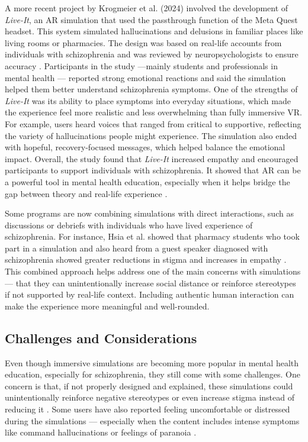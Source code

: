 A more recent project by Krogmeier et al. (2024) involved the development of \textit{Live-It}, an AR simulation that used the passthrough function of the Meta Quest headset. This system simulated hallucinations and delusions in familiar places like living rooms or pharmacies. The design was based on real-life accounts from individuals with schizophrenia and was reviewed by neuropsychologists to ensure accuracy \cite{Krogmeier2024}. Participants in the study  —mainly students and professionals in mental health — reported strong emotional reactions and said the simulation helped them better understand schizophrenia symptoms. One of the strengths of \textit{Live-It} was its ability to place symptoms into everyday situations, which made the experience feel more realistic and less overwhelming than fully immersive VR. For example, users heard voices that ranged from critical to supportive, reflecting the variety of hallucinations people might experience. The simulation also ended with hopeful, recovery-focused messages, which helped balance the emotional impact. Overall, the study found that \textit{Live-It} increased empathy and encouraged participants to support individuals with schizophrenia. It showed that AR can be a powerful tool in mental health education, especially when it helps bridge the gap between theory and real-life experience \cite{Krogmeier2024}.

Some programs are now combining simulations with direct interactions, such as discussions or debriefs with individuals who have lived experience of schizophrenia. For instance, Hsia et al. showed that pharmacy students who took part in a simulation and also heard from a guest speaker diagnosed with schizophrenia showed greater reductions in stigma and increases in empathy \cite{Hsia2022}. This combined approach helps address one of the main concerns with simulations — that they can unintentionally increase social distance or reinforce stereotypes if not supported by real-life context. Including authentic human interaction can make the experience more meaningful and well-rounded. 

\subsection{Challenges and Considerations}

Even though immersive simulations are becoming more popular in mental health education, especially for schizophrenia, they still come with some challenges. One concern is that, if not properly designed and explained, these simulations could unintentionally reinforce negative stereotypes or even increase stigma instead of reducing it \cite{Ando2011}. Some users have also reported feeling uncomfortable or distressed during the simulations — especially when the content includes intense symptoms like command hallucinations or feelings of paranoia \cite{Chaffin2013, Zare-Bidaki2022}.

